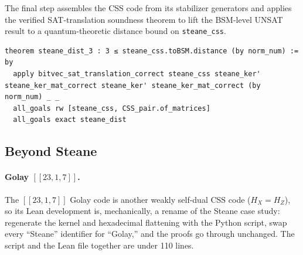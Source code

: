 The final step assembles the CSS code from its stabilizer generators and applies
the verified SAT-translation soundness theorem to lift the BSM-level UNSAT
result to a quantum-theoretic distance bound on \lstinline{steane_css}.

\begin{lstlisting}
theorem steane_dist_3 : 3 ≤ steane_css.toBSM.distance (by norm_num) := by
  apply bitvec_sat_translation_correct steane_css steane_ker' steane_ker_mat_correct steane_ker' steane_ker_mat_correct (by norm_num) _ _
  all_goals rw [steane_css, CSS_pair.of_matrices]
  all_goals exact steane_dist
\end{lstlisting}

%
%
%
%

\subsection{Beyond Steane}

\paragraph{Golay $[[23,1,7]]$.} The $[[23,1,7]]$ Golay code is another weakly
self-dual CSS code ($H_X = H_Z$), so its Lean development is, mechanically, a
rename of the Steane case study: regenerate the kernel and hexadecimal
flattening with the Python script, swap every ``Steane'' identifier for
``Golay,'' and the proofs go through unchanged. The script and the Lean file
together are under 110 lines.

